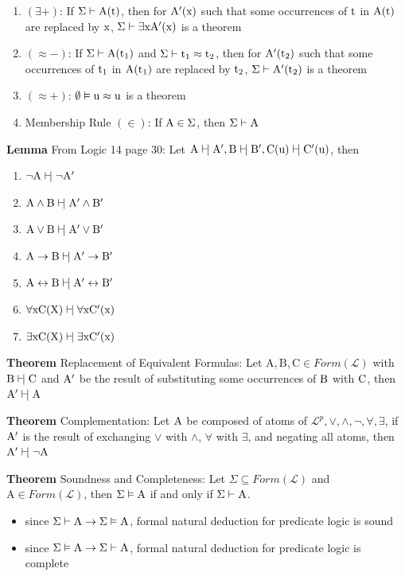 \documentclass[11pt,notitlepage]{report}
\newcommand{\mc}[1]{\ensuremath{\mathcal{#1}}}
\newcommand{\mr}[1]{\ensuremath{\mathrm{#1}}}
\newcommand{\tbf}[1]{\textbf{#1}}
\newcommand{\vdashv}{\mathrel{\vdash\!\rvert}}
\begin{document}
\begin{enumerate}
    \item $(\exists +)$: If $\rm \Sigma \vdash A(t)$, then for $\rm A'(x)$ such that some occurrences of $\rm t$ in $\rm A(t)$ are replaced by $\rm x$, $\rm \Sigma \vdash \exists x \rm A'(x)$ is a theorem
    \item $(\approx -)$: If $\rm \Sigma \vdash A(t_1)$ and $\rm \Sigma \vdash t_1 \approx t_2$, then for $\rm A'(t_2)$ such that some occurrences of $\rm t_1$ in $\rm A(t_1)$ are replaced by $\rm t_2$, $\rm \Sigma \vdash A'(t_2)$ is a theorem
    \item $(\approx +)$: $\emptyset \rm \vDash u \approx u$ is a theorem
    \item Membership Rule $(\in)$: If $\rm A \in \Sigma$, then $\Sigma \vdash \rm A$
\end{enumerate}

\tbf{Lemma} From Logic 14 page 30: Let $\rm A \vdashv A', B \vdashv B', C(u) \vdashv C'(u)$, then
\begin{enumerate}
    \item $\rm \neg A \vdashv \neg A'$
    \item $\rm A \wedge B \vdashv A' \wedge B'$
    \item $\rm A \vee B \vdashv A' \vee B'$
    \item $\rm A \to B \vdashv A' \to B'$
    \item $\rm A \leftrightarrow B \vdashv A' \leftrightarrow B'$
    \item $\rm \forall x C(X) \vdashv \forall x C'(x)$
    \item $\rm \exists x C(X) \vdashv \exists x C'(x)$
\end{enumerate}

\tbf{Theorem} Replacement of Equivalent Formulas: Let $\mr{ A, B, C }\in Form(\mc L)$ with $\rm B \vdashv C$ and $\rm A'$ be the result of substituting some occurrences of $\rm B$ with $\rm C$, then $\rm A' \vdashv A$

\tbf{Theorem} Complementation: Let $\rm A$ be composed of atoms of $\mc L^p, \vee, \wedge, \neg, \forall, \exists$, if $\rm A'$ is the result of exchanging $\vee$ with $\wedge$, $\forall$ with $\exists$, and negating all atoms, then $\rm A' \vdashv \neg A$

\tbf{Theorem} Soundness and Completeness: Let $\Sigma \subseteq Form(\mc L)$ and $\mr{A} \in Form(\mc L)$, then $\Sigma \vDash \rm A$ if and only if $\Sigma \vdash \rm A$.
\begin{itemize}
    \item since $\Sigma \vdash \rm A \to \Sigma \vDash A$, formal natural deduction for predicate logic is sound 
    \item since $\Sigma \vDash \rm A \to \Sigma \vdash A$, formal natural deduction for predicate logic is complete 
\end{itemize}
\end{document}
